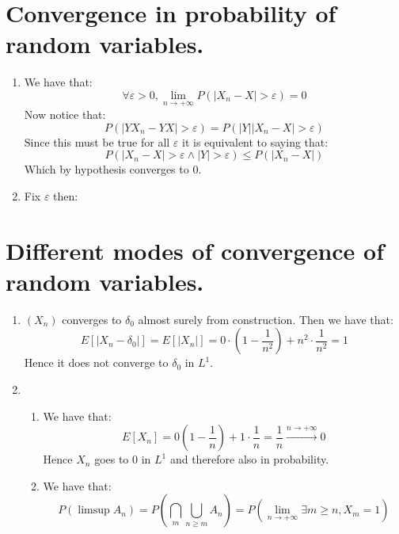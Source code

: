 \documentclass[10pt,a4paper]{book}
\begin{document}
\section{Convergence in probability of random variables.}
\begin{enumerate}

\item We have that:
\[
\forall \varepsilon > 0, \lim_{n \to +\infty} P(|X_n - X| > \varepsilon) = 0
\]
Now notice that:
\[
P(|YX_{n} - YX| > \varepsilon) = P(|Y||X_n - X| > \varepsilon)
\]
Since this must be true for all $\varepsilon$ it is equivalent to saying that:
\[
P(|X_n - X| > \varepsilon \land |Y| > \varepsilon) \leq P(|X_n - X|) 
\]
Which by hypothesis converges to 0.

\item Fix $\varepsilon$ then:

\end{enumerate}

\section{Different modes of convergence of random variables.}
\begin{enumerate}

\item $(X_n)$ converges to $\delta_0$ almost surely from construction. Then we have that:
\[
E[|X_n - \delta_0|] = E[|X_n|] = 0 \cdot (1 - \frac{1}{n^2}) + n^2 \cdot \frac{1}{n^2} = 1
\] 
Hence it does not converge to $\delta_0$ in $L^1$. 

\item 
\begin{enumerate}

\item We have that:
\[
E[X_n] = 0 (1- \frac{1}{n}) + 1 \cdot \frac{1}{n} = \frac{1}{n} \stackrel{n \to +\infty}{\longrightarrow} 0 
\]
Hence $X_n$ goes to $0$ in $L^1$ and therefore also in probability.

\item We have that:
\[
P(\limsup A_n) = P(\bigcap_{m} \bigcup_{n \geq m} A_n) = P(\lim_{n \to +\infty} \exists m \geq n, X_m = 1)
\]


\end{enumerate}

\end{enumerate}
\end{document}
